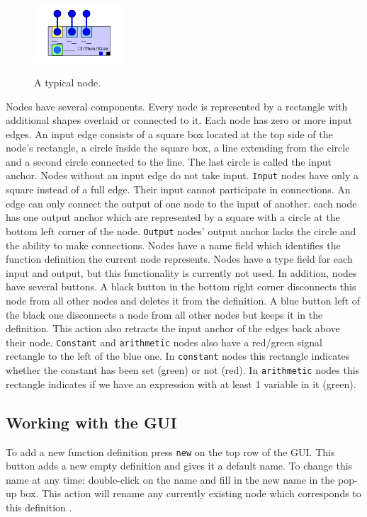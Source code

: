 \documentclass[12pt,UTF8,a4]{article}
\newcommand{\code}[1]{\texttt{#1}}
\begin{document}
\begin{figure}[!ht]
\center
\includegraphics[width=0.3\textwidth]{./images/node} \\
\caption{A typical node.}\label{fig:node}
\end{figure}


Nodes have several components. Every node is represented by a rectangle with additional shapes overlaid or connected to it.  Each node has zero or more input edges. An input edge consists of a square box located at the top side of the node's rectangle, a circle inside the square box, a line extending from the circle and a second circle connected to the line. The last circle is called the input anchor. Nodes without an input edge do not take input.  \code{Input} nodes have only a square instead of a full edge. Their input cannot participate in connections. An edge can only connect the output of one node to the input of another. each node has one output anchor which are represented by a square with a circle at the bottom left corner of the node. \code{Output} nodes' output anchor lacks the circle and the ability to make connections. Nodes have a name field which identifies the function definition the current node represents. Nodes have a type field for each input and output, but this functionality is currently not used. In addition, nodes have several buttons.  A black button in the bottom right corner disconnects this node from all other nodes and deletes it from the definition. A blue button left of the black one disconnects a node from all other nodes but keeps it in the definition. This action also retracts the  input anchor of the edges back above their node. \code{Constant} and \code{arithmetic} nodes also have a red/green signal rectangle to the left of the blue one. In \code{constant} nodes this rectangle indicates whether the constant has been set (green) or not (red). In \code{arithmetic} nodes this rectangle indicates if we have an expression with at least 1 variable in it (green).


\subsection{Working with the GUI}

To add a new function definition press \code{new} on the top row of the GUI. This button adds a new empty definition and gives it a default name. To change this name at any time: double-click on the name and fill in the new name in the pop-up box. This action will rename any currently existing node which corresponds to this definition .
\end{document}
